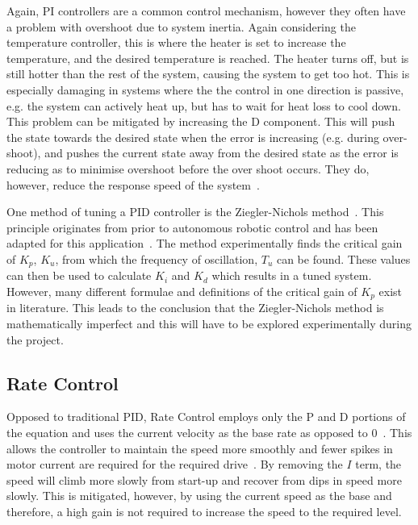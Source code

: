 Again, PI controllers are a common control mechanism, however they often have a problem with overshoot due to system inertia. Again considering the temperature controller, this is where the heater is set to increase the temperature, and the desired temperature is reached. The heater turns off, but is still hotter than the rest of the system, causing the system to get too hot. This is especially damaging in systems where the the control in one direction is passive, e.g. the system can actively heat up, but has to wait for heat loss to cool down. This problem can be mitigated by increasing the D component. This will push the state towards the desired state when the error is increasing (e.g. during over-shoot), and pushes the current state away from the desired state as the error is reducing as to minimise overshoot before the over shoot occurs. They do, however, reduce the response speed of the system~\cite{chen2007linear}.

One method of tuning a PID controller is the Ziegler-Nichols method~\cite{ziegler1942optimum}. This principle originates from prior to autonomous robotic control and has been adapted for this application~\cite{aastrom2004revisiting}. The method experimentally finds the critical gain of $K_p$, $K_u$, from which the frequency of oscillation, $T_u$ can be found. These values can then be used to calculate $K_i$ and $K_d$ which results in a tuned system. However, many different formulae and definitions of the critical gain of $K_p$ exist in literature. This leads to the conclusion that the Ziegler-Nichols method is mathematically imperfect and this will have to be explored experimentally during the project.     

\subsection{Rate Control}\label{litreview/robotics/ratecontrol}
Opposed to traditional PID, Rate Control employs only the P and D portions of the equation and uses the current velocity as the base rate as opposed to 0~\cite{koditschek1987quadratic}. This allows the controller to maintain the speed more smoothly and fewer spikes in motor current are required for the required drive~\cite{kawamura1988local}. By removing the $I$ term, the speed will climb more slowly from start-up and recover from dips in speed more slowly. This is mitigated, however, by using the current speed as the base and therefore, a high gain is not required to increase the speed to the required level. 


